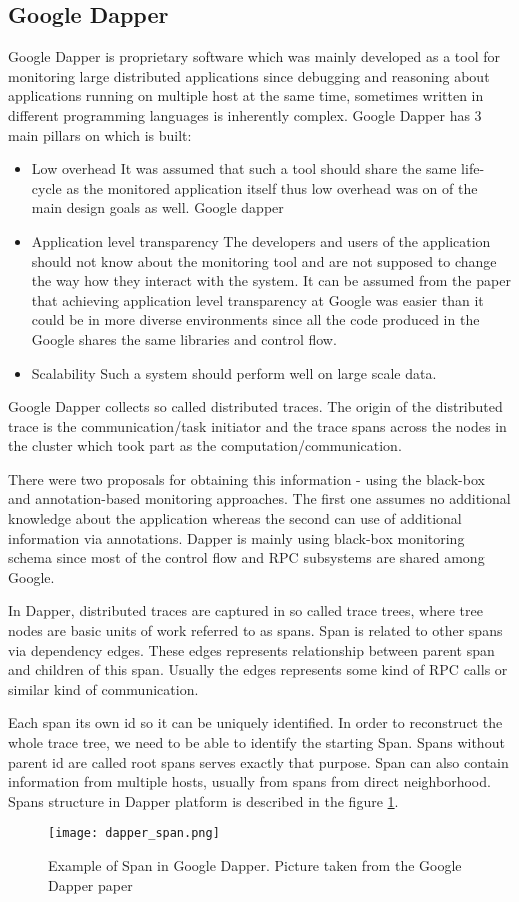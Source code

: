 \subsection{Google Dapper}
Google Dapper is proprietary software which was mainly developed as a tool for monitoring large distributed applications since debugging and reasoning about applications running on multiple host at the same time, sometimes written in different programming languages is inherently complex. Google Dapper has 3 main pillars on which is built:
\begin{itemize}
	\item Low overhead
	It was assumed that such a tool should share the same life-cycle as the monitored application itself thus low overhead was on of the main design goals as well. Google dapper 
	\item Application level transparency
	The developers and users of the application should not know about the monitoring tool and are not supposed to change the way how they interact with the system. It can be assumed from the paper that achieving application level transparency at Google was easier than it could be in more diverse environments since all the code produced in the Google shares the same libraries and control flow.
	\item Scalability
	Such a system should perform well on large scale data.
\end{itemize}	
Google Dapper collects so called distributed traces. The origin of the distributed trace is the communication/task initiator and the trace spans across the nodes in the cluster which took part as the computation/communication.
	
There were two proposals for obtaining this information - using the black-box and annotation-based monitoring approaches. The first one assumes no additional knowledge about the application whereas the second can use of additional information via annotations. Dapper is mainly using black-box monitoring schema since most of the control flow and RPC subsystems are shared among Google.
	
In Dapper, distributed traces are captured in so called trace trees, where tree nodes are basic units of work referred to as spans. Span is related to other spans via dependency edges. These edges represents relationship between parent span and children of this span. Usually the edges represents some kind of RPC calls or similar kind of communication.

Each span its own id so it can be uniquely identified. In order to reconstruct the whole trace tree, we need to be able to identify the starting Span. Spans without parent id are called root spans serves exactly that purpose. Span can also contain information from multiple hosts, usually from spans from direct neighborhood. Spans structure in Dapper platform is described in the figure \ref{fig:dapper_span}.
\begin{figure}
	\centering
		\texttt{[image: dapper\_span.png]}
	\caption{Example of Span in Google Dapper. Picture taken from the Google Dapper paper}
	\label{fig:dapper_span}
\end{figure}

